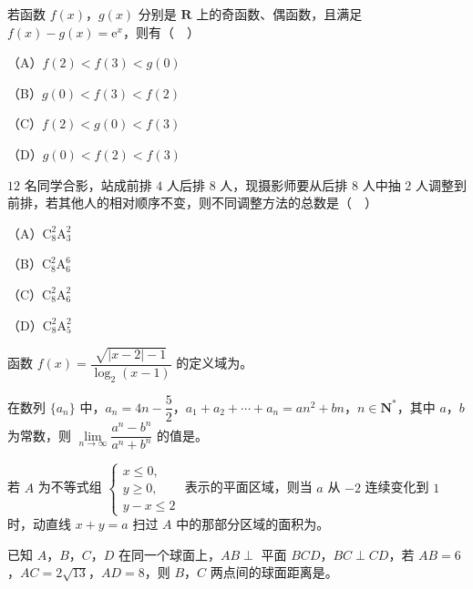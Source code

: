 \begin{question}
若函数 $f(x)$，$g(x)$ 分别是 $\mathbf R$ 上的奇函数、偶函数，且满足 $f(x)-g(x)=\mathrm e^x$，则有（　）

（A）$f(2)<f(3)<g(0)$

（B）$g(0)<f(3)<f(2)$

（C）$f(2)<g(0)<f(3)$

（D）$g(0)<f(2)<f(3)$

\end{question}
\begin{question}
$12$ 名同学合影，站成前排 $4$ 人后排 $8$ 人，现摄影师要从后排 $8$ 人中抽 $2$ 人调整到前排，若其他人的相对顺序不变，则不同调整方法的总数是（　）

（A）$\mathrm C_8^2\mathrm A_3^2$

（B）$\mathrm C_8^2\mathrm A_6^6$

（C）$\mathrm C_8^2\mathrm A_6^2$

（D）$\mathrm C_8^2\mathrm A_5^2$

\end{question}

\begin{question}
函数 $f(x)=\dfrac{\sqrt{|x-2|-1}}{\log_2(x-1)}$ 的定义域为\gkblank{}。

\end{question}
\begingroup
\renewenvironment{question}{\Needspace{0.46\textheight}}{}
\begin{question}
在数列 $\{a_n\}$ 中，$a_n=4n-\dfrac52$，$a_1+a_2+\cdots+a_n=an^2+bn$，$n\in\mathbf N^*$，其中 $a$，$b$ 为常数，则 $\lim\limits_{n\to\infty}\dfrac{a^n-b^n}{a^n+b^n}$ 的值是\gkblank{}。

\end{question}
\endgroup
\begin{question}
若 $A$ 为不等式组 $\begin{cases}x\leqslant0,\\ y\geqslant0,\\ y-x\leqslant2\end{cases}$ 表示的平面区域，则当 $a$ 从 $-2$ 连续变化到 $1$ 时，动直线 $x+y=a$ 扫过 $A$ 中的那部分区域的面积为\gkblank{}。

\end{question}
\begin{question}
已知 $A$，$B$，$C$，$D$ 在同一个球面上，$AB\perp$ 平面 $BCD$，$BC\perp CD$，若 $AB=6$，$AC=2\sqrt{13}$，$AD=8$，则 $B$，$C$ 两点间的球面距离是\gkblank{}。

\end{question}

